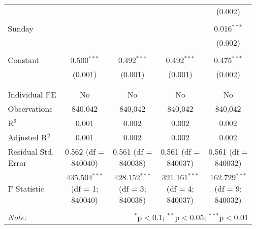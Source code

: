 \documentclass[
]{article}
\begin{document}
\begin{table}[!htbp]
{\begin{tabular}{@{\extracolsep{5pt}}lcccc}
  &  &  &  & (0.002) \\ 
  & & & & \\ 
 Sunday &  &  &  & 0.016$^{***}$ \\ 
  &  &  &  & (0.002) \\ 
  & & & & \\ 
 Constant & 0.500$^{***}$ & 0.492$^{***}$ & 0.492$^{***}$ & 0.475$^{***}$ \\ 
  & (0.001) & (0.001) & (0.001) & (0.002) \\ 
  & & & & \\ 
\hline \\[-1.8ex] 
Individual FE & No & No & No & No \\ 
Observations & 840,042 & 840,042 & 840,042 & 840,042 \\ 
R$^{2}$ & 0.001 & 0.002 & 0.002 & 0.002 \\ 
Adjusted R$^{2}$ & 0.001 & 0.002 & 0.002 & 0.002 \\ 
Residual Std. Error & 0.562 (df = 840040) & 0.561 (df = 840038) & 0.561 (df = 840037) & 0.561 (df = 840032) \\ 
F Statistic & 435.504$^{***}$ (df = 1; 840040) & 428.152$^{***}$ (df = 3; 840038) & 321.161$^{***}$ (df = 4; 840037) & 162.729$^{***}$ (df = 9; 840032) \\ 
\hline 
\hline \\[-1.8ex] 
\textit{Note:}  & \multicolumn{4}{r}{$^{*}$p$<$0.1; $^{**}$p$<$0.05; $^{***}$p$<$0.01} \\ 
\end{tabular}
} 
\end{table} 
\newpage
\end{document}
